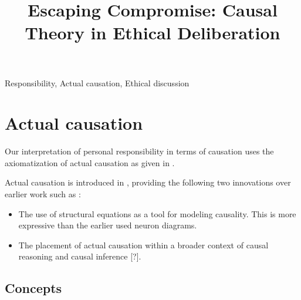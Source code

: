 \documentclass{iosart2c}
\begin{document}
\begin{frontmatter}

\title{Escaping Compromise: Causal Theory in Ethical Deliberation}
\runningtitle{}


\author[A]{ }
\author[A]{ }
\address[A]{VU University Amsterdam}

\begin{abstract}
\end{abstract}

\begin{keyword}
Responsibility, Actual causation, Ethical discussion
\end{keyword}

\end{frontmatter}


\section{Actual causation}

Our interpretation of personal responsibility in terms of causation uses the axiomatization of actual causation as given in \cite{halpern2011}.

Actual causation is introduced in \cite{pearl2000}, providing the following two innovations over earlier work such as \cite{lewis1973}:
\begin{itemize}
\item The use of structural equations as a tool for modeling causality. This is more expressive than the earlier used neuron diagrams.
\item The placement of actual causation within a broader context of causal reasoning and causal inference [?].
\end{itemize}

\subsection{Concepts}
\end{document}
